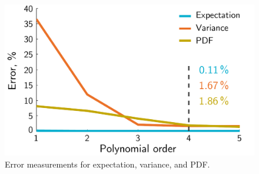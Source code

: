 \begin{figure}
  \centering
  \includegraphics[width=0.8\columnwidth]{include/assets/accuracy.pdf}
  \caption{Error measurements for expectation, variance, and PDF.}
  \vspace{-1.5em}
\end{figure}

